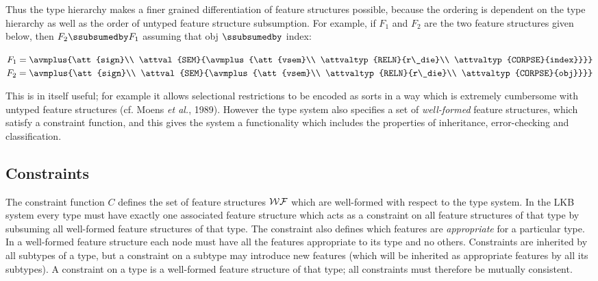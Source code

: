 \documentclass[12pt]{report}
\begin{document}
Thus the type hierarchy makes a finer grained differentiation of 
feature structures possible, because the ordering is dependent on the
type hierarchy as well as the order of untyped 
feature structure subsumption. 
For example, if $F_{1}$ and $F_{2}$ are the two feature structures given
below, then $F_{2} \ssubsumedby F_{1}$ assuming that {\type obj}
$\ssubsumedby$ {\type index}:
\begin{center}
{\tiny
$F_{1}=\avmplus{\att{sign}\\
             \attval{SEM}{\avmplus{\att{vsem}\\
                                   \attvaltyp{RELN}{r\_die}\\
                                   \attvaltyp{CORPSE}{index}}}}$
$F_{2}=\avmplus{\att{sign}\\
             \attval{SEM}{\avmplus{\att{vsem}\\
                                   \attvaltyp{RELN}{r\_die}\\
                                   \attvaltyp{CORPSE}{obj}}}}$

}
\end{center}
This is in itself 
useful; for example it allows selectional restrictions to be encoded as 
sorts in a way which is extremely cumbersome with untyped feature
structures
(cf. Moens {\it et al.}, 1989).
However the type system also specifies a set of
{\em well-formed} feature structures, which 
satisfy a constraint function, and this gives the system a functionality
which includes the properties of inheritance, error-checking and 
classification.

\subsection{Constraints}
\label{formcons}

The constraint function $C$ defines the set of feature structures ${\cal WF}$
which are well-formed with respect to the type system.
In the LKB system every type must have exactly one associated
feature structure which acts as a constraint on all feature structures
of that type by subsuming all well-formed feature structures of that
type.  The constraint also defines which features are {\em
appropriate} for a particular type. In a well-formed feature structure 
each node must have
all the features appropriate to its type and no others.  Constraints 
are inherited by
all subtypes of a type, but a constraint on a 
subtype may introduce new features
(which will be inherited as appropriate features by all its subtypes).
A constraint on a type is a well-formed feature structure of that
type; all constraints must therefore be mutually consistent.
\end{document}
